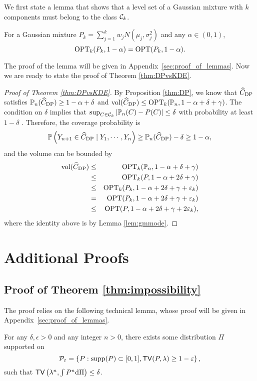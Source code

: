 We first state a lemma that shows that a level set of a Gaussian mixture with $k$ components must belong to the class $\mathcal{C}_k$.
\begin{lemma}\label{lem:gmmode}
For a Gaussian mixture $P_k=\sum_{j=1}^kw_jN(\mu_j,\sigma_j^2)$ and any $\alpha\in(0,1)$,
$$\operatorname{OPT}_k(P_k,1-\alpha)=\operatorname{OPT}(P_k,1-\alpha).$$
\end{lemma}
The proof of the lemma will be given in Appendix~\ref{sec:proof_of_lemmas}.
Now we are ready to state the proof of Theorem \ref{thm:DPvsKDE}.
\begin{proof}[Proof of Theorem \ref{thm:DPvsKDE}]
By Proposition \ref{thm:DP}, we know that $\widehat{C}_{\rm DP}$ satisfies $\mathbb{P}_n(\widehat{C}_{\rm DP})\geq 1-\alpha+\delta$ and $\mathrm{vol}(\widehat{C}_{\rm DP})\leq \operatorname{OPT}_k(\mathbb{P}_n,1-\alpha+\delta+\gamma)$. The condition on $\delta$ implies that $\sup_{C \in \mathcal{C}_k}|\mathbb{P}_n(C)-P(C)|\leq\delta$ with probability at least $1-\delta$ \citep{devroye2001combinatorial}. Therefore, the coverage probability is
$$\mathbb{P}\left(Y_{n+1}\in \widehat{C}_{\rm DP}\mid Y_1,\cdots,Y_n\right)\geq \mathbb{P}_n(\widehat{C}_{\rm DP})-\delta \geq 1-\alpha,$$
and the volume can be bounded by
\begin{eqnarray*}
\mathrm{vol}(\widehat{C}_{\rm DP}) &\leq & \operatorname{OPT}_k(\mathbb{P}_n,1-\alpha+\delta+\gamma) \\
&\leq& \operatorname{OPT}_k(P,1-\alpha+2\delta+\gamma) \\
&\leq& \operatorname{OPT}_k(P_k,1-\alpha+2\delta+\gamma+\varepsilon_k) \\
&=& \operatorname{OPT}(P_k,1-\alpha+2\delta+\gamma+\varepsilon_k) \\
&\leq& \operatorname{OPT}(P,1-\alpha+2\delta+\gamma+2\varepsilon_k),
\end{eqnarray*}
where the identity above is by Lemma \ref{lem:gmmode}.
\end{proof}


\section{Additional Proofs}\label{sec:proofs}


\subsection{Proof of Theorem \ref{thm:impossibility}}

The proof relies on the following technical lemma, whose proof will be given in Appendix~\ref{sec:proof_of_lemmas}.

\begin{lemma}\label{lem:tv}
For any $\delta,\epsilon>0$ and any integer $n>0$, there exists some distribution $\Pi$ supported on
$$\mathcal{P}_{\varepsilon}=\left\{P:\text{supp}(P)\subset[0,1],{\sf TV}(P,\lambda)\geq 1-\varepsilon\right\},$$
such that ${\sf TV}\left(\lambda^n,\int P^n \mathrm{d}\Pi\right)\leq \delta$. 
\end{lemma}


